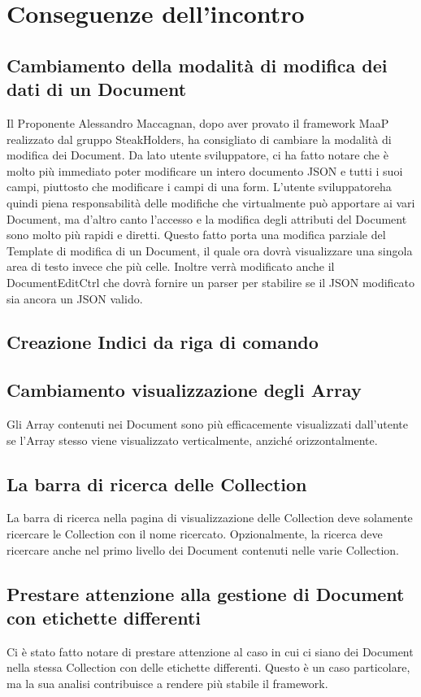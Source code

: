 \newpage
\section{Conseguenze dell'incontro}
\label{2}

\subsection{Cambiamento della modalità di modifica dei dati di un Document}
Il Proponente Alessandro Maccagnan, dopo aver provato il framework MaaP realizzato dal gruppo SteakHolders, 
ha consigliato di cambiare la modalità di modifica dei Document.
Da lato utente sviluppatore, ci ha fatto notare che è molto più immediato poter modificare un intero documento 
JSON e tutti i suoi campi, piuttosto che modificare i campi di una form. 
L'utente sviluppatoreha quindi piena responsabilità delle modifiche che virtualmente può apportare ai vari Document, 
ma d'altro canto l'accesso e la modifica degli attributi del Document sono molto più rapidi e diretti.
Questo fatto porta una modifica parziale del Template di modifica di un Document, il quale ora dovrà visualizzare una singola
area di testo invece che più celle. Inoltre verrà modificato anche il DocumentEditCtrl che dovrà fornire un parser per stabilire 
se il JSON modificato sia ancora un JSON valido.

\subsection{Creazione Indici da riga di comando}

\subsection{Cambiamento visualizzazione degli Array}
Gli Array contenuti nei Document sono più efficacemente visualizzati dall'utente se l'Array stesso viene visualizzato verticalmente,
anziché orizzontalmente.

\subsection{La barra di ricerca delle Collection}
La barra di ricerca nella pagina di visualizzazione delle Collection deve solamente ricercare le Collection con il nome ricercato.
Opzionalmente, la ricerca deve ricercare anche nel primo livello dei Document contenuti nelle varie Collection. 

\subsection{Prestare attenzione alla gestione di Document con etichette differenti}
Ci è stato fatto notare di prestare attenzione al caso in cui ci siano dei Document nella stessa Collection con delle etichette 
differenti. Questo è un caso particolare, ma la sua analisi contribuisce a rendere più stabile il framework.

